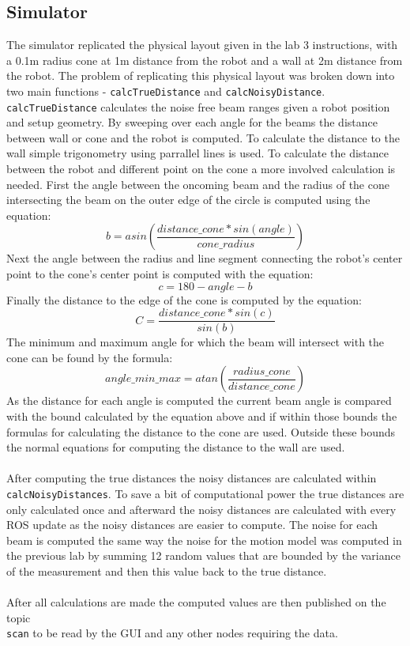 \documentclass[letterpaper,12pt]{article}
\begin{document}
\subsection{Simulator}
The simulator replicated the physical layout given in the lab 3 instructions, with a 0.1m radius cone at 1m distance from the robot and a wall at 2m distance from the robot. The problem of replicating this physical layout was broken down into two main functions - \texttt{calcTrueDistance} and \texttt{calcNoisyDistance}. \texttt{calcTrueDistance} calculates the noise free beam ranges given a robot position and setup geometry. By sweeping over each angle for the beams the distance between wall or cone and the robot is computed. To calculate the distance to the wall simple trigonometry using parrallel lines is used. To calculate the distance between the robot and different point on the cone a more involved calculation is needed. First the angle between the oncoming beam and the radius of the cone intersecting the beam on the outer edge of the circle is computed using the equation:
$$b = asin\left(\frac{distance\_cone*sin(angle)}{cone\_radius}\right)$$
Next the angle between the radius and line segment connecting the robot's center point to the cone's center point is computed with the equation:
$$c = 180 - angle - b$$
Finally the distance to the edge of the cone is computed by the equation:
$$C = \frac{distance\_cone * sin(c)}{sin(b)}$$
The minimum and maximum angle for which the beam will intersect with the cone can be found by the formula:
$$angle\_min\_max = atan\left(\frac{radius\_cone}{distance\_cone}\right)$$ 
As the distance for each angle is computed the current beam angle is compared with the bound calculated by the equation above and if within those bounds the formulas for calculating the distance to the cone are used. Outside these bounds the normal equations for computing the distance to the wall are used. 
\\\\
After computing the true distances the noisy distances are calculated within \texttt{calcNoisyDistances}. To save a bit of computational power the true distances are only calculated once and afterward the noisy distances are calculated with every ROS update as the noisy distances are easier to compute. The noise for each beam is computed the same way the noise for the motion model was computed in the previous lab by summing 12 random values that are bounded by the variance of the measurement and then this value back to the true distance. 
\\\\
After all calculations are made the computed values are then published on the topic \texttt{\\scan} to be read by the GUI and any other nodes requiring the data. 
\end{document}
